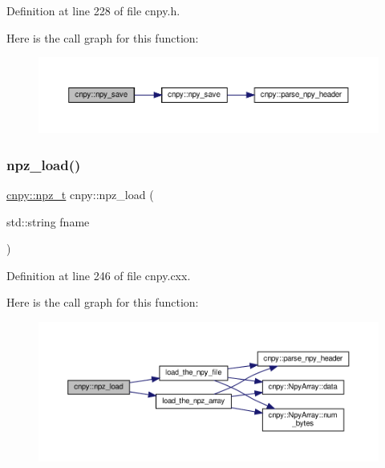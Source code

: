 Definition at line 228 of file cnpy.\+h.

Here is the call graph for this function\+:
\nopagebreak
\begin{figure}[H]
\begin{center}
\leavevmode
\includegraphics[width=350pt]{namespacecnpy_a9311beeca7e441c777c78fc80be40649_cgraph}
\end{center}
\end{figure}
\mbox{\label{namespacecnpy_ab6ef932e48b81bddc5457ff4ceb44a3a}} 
\subsubsection{\texorpdfstring{npz\+\_\+load()}{npz\_load()}\hspace{0.1cm}{\footnotesize\ttfamily [1/2]}}
{\footnotesize\ttfamily \hyperlink{namespacecnpy_acfea2d25a7c0e41b79f04864b0a64a2b}{cnpy\+::npz\+\_\+t} cnpy\+::npz\+\_\+load (\begin{DoxyParamCaption}\item[{std\+::string}]{fname }\end{DoxyParamCaption})}



Definition at line 246 of file cnpy.\+cxx.

Here is the call graph for this function\+:
\nopagebreak
\begin{figure}[H]
\begin{center}
\leavevmode
\includegraphics[width=350pt]{namespacecnpy_ab6ef932e48b81bddc5457ff4ceb44a3a_cgraph}
\end{center}
\end{figure}
\mbox{\label{namespacecnpy_abfeb43960d51a799dbe718b3d73e8b52}} 
